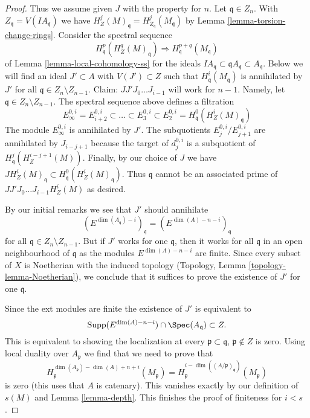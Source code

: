 \begin{proof}
\medskip\noindent
Thus we assume given $J$ with the property for $n$. Let $\mathfrak q \in Z_n$.
With $Z_\mathfrak q = V(IA_\mathfrak q)$ we have
$H^j_Z(M)_\mathfrak q = H^j_{Z_\mathfrak q}(M_\mathfrak q)$
by Lemma \ref{lemma-torsion-change-rings}.
Consider the spectral sequence
$$
H_\mathfrak q^p(H^q_Z(M)_\mathfrak q) \Rightarrow
H^{p + q}_\mathfrak q(M_\mathfrak q)
$$
of Lemma \ref{lemma-local-cohomology-ss} for the ideals
$IA_\mathfrak q \subset \mathfrak qA_\mathfrak q \subset A_\mathfrak q$.
Below we will find an ideal $J' \subset A$ with $V(J') \subset Z$
such that $H^i_\mathfrak q(M_\mathfrak q)$ is annihilated by $J'$ for all
$\mathfrak q \in Z_n \setminus Z_{n - 1}$.
Claim: $JJ'J_0 \ldots J_{i - 1}$ will work for $n - 1$.
Namely, let $\mathfrak q \in Z_n \setminus Z_{n - 1}$.
The spectral sequence above defines a filtration
$$
E_\infty^{0, i} = E_{i + 2}^{0, i} \subset \ldots \subset E_3^{0, i} \subset
E_2^{0, i} = H^0_\mathfrak q(H^i_Z(M)_\mathfrak q)
$$
The module $E_\infty^{0, i}$ is annihilated by $J'$. The subquotients
$E_j^{0, i}/E_{j + 1}^{0, i}$ are annihilated by $J_{i - j + 1}$
because the target of $d_j^{0, i}$ is a subquotient of
$H^j_\mathfrak q(H^{i - j + 1}_Z(M))$.
Finally, by our choice of $J$ we have
$J H^i_Z(M)_\mathfrak q \subset H^0_\mathfrak q(H^i_Z(M)_\mathfrak q)$.
Thus $\mathfrak q$ cannot be an associated prime of
$JJ'J_0 \ldots J_{i - 1}H^i_Z(M)$ as desired.

\medskip\noindent
By our initial remarks we see that $J'$ should annihilate
$$
(E^{\dim(A_\mathfrak q) - i})_\mathfrak q =
(E^{\dim(A) - n - i})_\mathfrak q
$$
for all $\mathfrak q \in Z_n \setminus Z_{n - 1}$.
But if $J'$ works for one $\mathfrak q$, then it works for all
$\mathfrak q$ in an open neighbourhood of $\mathfrak q$
as the modules $E^{\dim(A) - n - i}$ are finite.
Since every subset of $X$ is Noetherian with the induced
topology (Topology, Lemma \ref{topology-lemma-Noetherian}),
we conclude that it suffices
to prove the existence of $J'$ for one $\mathfrak q$.

\medskip\noindent
Since the ext modules are finite the existence of $J'$ is
equivalent to
$$
\text{Supp}(E^{\dim(A) - n - i}) \cap \Spec(A_\mathfrak q) \subset Z.
$$
This is equivalent to showing the localization at every
$\mathfrak p \subset \mathfrak q$, $\mathfrak p \not \in Z$
is zero. Using local duality over $A_\mathfrak p$ we find that we need
to prove that
$$
H^{\dim(A_\mathfrak p) - \dim(A) + n + i}_\mathfrak p(M_\mathfrak p) =
H^{i - \dim((A/\mathfrak p)_\mathfrak q)}_\mathfrak p(M_\mathfrak p)
$$
is zero (this uses that $A$ is catenary). This vanishes exactly by
our definition of $s(M)$ and Lemma \ref{lemma-depth}.
This finishes the proof of finiteness for $i < s$.


\end{proof}
